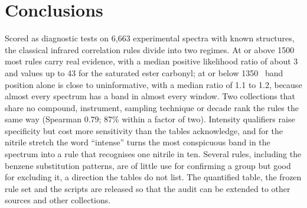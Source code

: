 \section{Conclusions}
\label{sec:conclusions}

Scored as diagnostic tests on 6,663 experimental spectra with known structures, the classical infrared correlation rules divide into two regimes. At or above 1500~\wn{} most rules carry real evidence, with a median positive likelihood ratio of about 3 and values up to 43 for the saturated ester carbonyl; at or below 1350~\wn{} band position alone is close to uninformative, with a median ratio of 1.1 to 1.2, because almost every spectrum has a band in almost every window. Two collections that share no compound, instrument, sampling technique or decade rank the rules the same way (Spearman 0.79; 87\% within a factor of two). Intensity qualifiers raise specificity but cost more sensitivity than the tables acknowledge, and for the nitrile stretch the word ``intense'' turns the most conspicuous band in the spectrum into a rule that recognises one nitrile in ten. Several rules, including the benzene substitution patterns, are of little use for confirming a group but good for excluding it, a direction the tables do not list. The quantified table, the frozen rule set and the scripts are released so that the audit can be extended to other sources and other collections.
